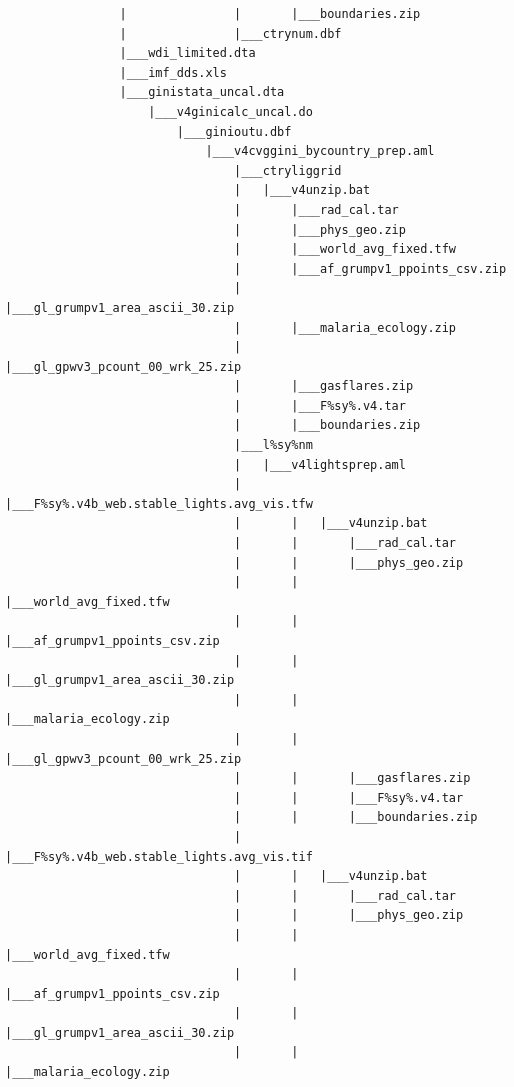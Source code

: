 \documentclass[]{book}
\begin{document}
\begin{verbatim}
                |               |       |___boundaries.zip
                |               |___ctrynum.dbf
                |___wdi_limited.dta
                |___imf_dds.xls
                |___ginistata_uncal.dta
                    |___v4ginicalc_uncal.do
                        |___ginioutu.dbf
                            |___v4cvggini_bycountry_prep.aml
                                |___ctryliggrid
                                |   |___v4unzip.bat
                                |       |___rad_cal.tar
                                |       |___phys_geo.zip
                                |       |___world_avg_fixed.tfw
                                |       |___af_grumpv1_ppoints_csv.zip
                                |       |___gl_grumpv1_area_ascii_30.zip
                                |       |___malaria_ecology.zip
                                |       |___gl_gpwv3_pcount_00_wrk_25.zip
                                |       |___gasflares.zip
                                |       |___F%sy%.v4.tar
                                |       |___boundaries.zip
                                |___l%sy%nm
                                |   |___v4lightsprep.aml
                                |       |___F%sy%.v4b_web.stable_lights.avg_vis.tfw
                                |       |   |___v4unzip.bat
                                |       |       |___rad_cal.tar
                                |       |       |___phys_geo.zip
                                |       |       |___world_avg_fixed.tfw
                                |       |       |___af_grumpv1_ppoints_csv.zip
                                |       |       |___gl_grumpv1_area_ascii_30.zip
                                |       |       |___malaria_ecology.zip
                                |       |       |___gl_gpwv3_pcount_00_wrk_25.zip
                                |       |       |___gasflares.zip
                                |       |       |___F%sy%.v4.tar
                                |       |       |___boundaries.zip
                                |       |___F%sy%.v4b_web.stable_lights.avg_vis.tif
                                |       |   |___v4unzip.bat
                                |       |       |___rad_cal.tar
                                |       |       |___phys_geo.zip
                                |       |       |___world_avg_fixed.tfw
                                |       |       |___af_grumpv1_ppoints_csv.zip
                                |       |       |___gl_grumpv1_area_ascii_30.zip
                                |       |       |___malaria_ecology.zip

\end{verbatim}
\end{document}

